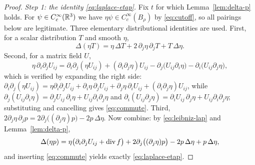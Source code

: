 \documentclass[11pt,reqno]{amsart}
\begin{document}
\begin{proof}
\emph{Step 1: the identity \eqref{eq:laplace-etap}.} Fix $t$ for which
Lemma~\ref{lem:delta-p} holds. For $\psi\in C_{c}^{\infty}(\mathbb{R}^{3})$ we have
$\eta\psi\in C_{c}^{\infty}(B_{\rho})$ by \eqref{eq:cutoff}, so all pairings
below are legitimate. Three elementary distributional identities are used. First,
for a scalar distribution $T$ and smooth $\eta$,
\begin{equation}\label{eq:leibniz-lap}
  \Delta(\eta T)=\eta\,\Delta T+2\,\partial_{j}\eta\,\partial_{j}T+T\,\Delta\eta .
\end{equation}
Second, for a matrix field $U$,
\begin{equation}\label{eq:commute}
  \eta\,\partial_{i}\partial_{j}U_{ij}
  =\partial_{i}\partial_{j}(\eta U_{ij})
   +(\partial_{i}\partial_{j}\eta)U_{ij}
   -\partial_{j}\bigl(U_{ij}\partial_{i}\eta\bigr)
   -\partial_{i}\bigl(U_{ij}\partial_{j}\eta\bigr),
\end{equation}
which is verified by expanding the right side:
$\partial_{i}\partial_{j}(\eta U_{ij})
 =\eta\partial_{i}\partial_{j}U_{ij}+\partial_{i}\eta\,\partial_{j}U_{ij}
  +\partial_{j}\eta\,\partial_{i}U_{ij}+(\partial_{i}\partial_{j}\eta)U_{ij}$,
while
$\partial_{j}(U_{ij}\partial_{i}\eta)
 =\partial_{j}U_{ij}\,\partial_{i}\eta+U_{ij}\partial_{i}\partial_{j}\eta$
and
$\partial_{i}(U_{ij}\partial_{j}\eta)
 =\partial_{i}U_{ij}\,\partial_{j}\eta+U_{ij}\partial_{i}\partial_{j}\eta$;
substituting and cancelling gives \eqref{eq:commute}. Third,
$2\partial_{j}\eta\,\partial_{j}p
 =2\partial_{j}\bigl((\partial_{j}\eta)p\bigr)-2p\,\Delta\eta$.
Now combine: by \eqref{eq:leibniz-lap} and
Lemma~\ref{lem:delta-p},
\[
  \Delta(\eta p)
  =\eta\bigl(\partial_{i}\partial_{j}U_{ij}+\operatorname{div} f\bigr)
   +2\partial_{j}\bigl((\partial_{j}\eta)p\bigr)-2p\,\Delta\eta+p\,\Delta\eta ,
\]
and inserting \eqref{eq:commute} yields exactly \eqref{eq:laplace-etap}.


\end{proof}
\end{document}
